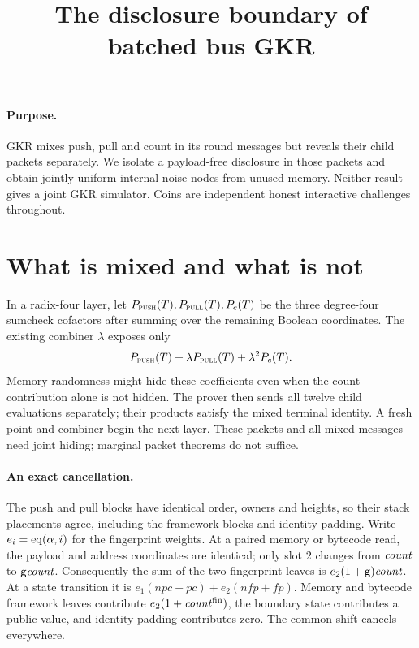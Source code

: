 \documentclass[11pt]{article}
\title{The disclosure boundary of batched bus GKR}
\author{}
\date{}
\begin{document}
\maketitle
\vspace{-2em}

\paragraph{Purpose.} GKR mixes push, pull and count in its round messages but reveals their child packets separately. We isolate a payload-free disclosure in those packets and obtain jointly uniform internal noise nodes from unused memory. Neither result gives a joint GKR simulator. Coins are independent honest interactive challenges throughout.

\section{What is mixed and what is not}

In a radix-four layer, let $P_{\textsc{push}}(T),P_{\textsc{pull}}(T),P_c(T)$ be the three degree-four sumcheck cofactors after summing over the remaining Boolean coordinates. The existing combiner $\lambda$ exposes only
\[
 P_{\textsc{push}}(T)+\lambda P_{\textsc{pull}}(T)+\lambda^2P_c(T).
\]
Memory randomness might hide these coefficients even when the count contribution alone is not hidden. The prover then sends all twelve child evaluations separately; their products satisfy the mixed terminal identity. A fresh point and combiner begin the next layer. These packets and all mixed messages need joint hiding; marginal packet theorems do not suffice.

\paragraph{An exact cancellation.} The push and pull blocks have identical order, owners and heights, so their stack placements agree, including the framework blocks and identity padding. Write $e_i=\operatorname{eq}(\alpha,i)$ for the fingerprint weights. At a paired memory or bytecode read, the payload and address coordinates are identical; only slot $2$ changes from $\mathit{count}$ to $\mathsf{g}\mathit{count}$. Consequently the sum of the two fingerprint leaves is $e_2(1+\mathsf{g})\mathit{count}$. At a state transition it is $e_1(\mathit{npc}+\mathit{pc})+e_2(\mathit{nfp}+\mathit{fp})$. Memory and bytecode framework leaves contribute $e_2(1+\mathit{count}^{\mathrm{fin}})$, the boundary state contributes a public value, and identity padding contributes zero. The common shift cancels everywhere.
\end{document}
